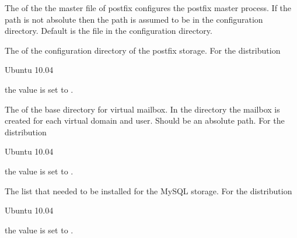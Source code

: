 
The  of the the master file of postfix configures
the postfix master process. 
If the path is not absolute then the path is assumed to be
in the configuration directory.
Default is the file  in the configuration directory.


The  of the configuration directory of the postfix storage. 
For the distribution
\begin{inparaitem}
\item[\TheDistribution{ubuntu}] Ubuntu 10.04
\end{inparaitem}
the value is set to .


The  of the base directory for virtual mailbox.
In the directory the mailbox is created for each virtual domain and user.
Should be an absolute path.
For the distribution
\begin{inparaitem}
\item[\TheDistribution{ubuntu}] Ubuntu 10.04
\end{inparaitem}
the value is set to .


The  list that needed to be installed for the MySQL storage.
For the distribution
\begin{inparaitem}
\item[\TheDistribution{ubuntu}] Ubuntu 10.04
\end{inparaitem}
the value is set to .


